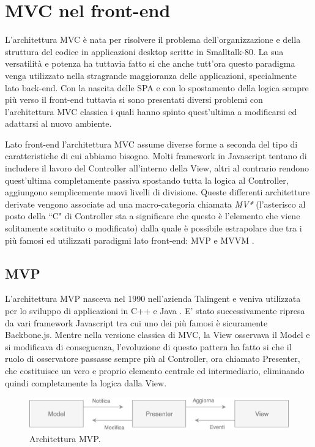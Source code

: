 \section{MVC nel front-end}
L'architettura MVC è nata per risolvere il problema dell'organizzazione e della struttura del codice in applicazioni desktop scritte in Smalltalk-80. La sua versatilità e potenza ha tuttavia fatto si che anche tutt'ora questo paradigma venga utilizzato nella stragrande maggioranza delle applicazioni, specialmente lato back-end.
Con la nascita delle SPA e con lo spostamento della logica sempre più verso il front-end tuttavia si sono presentati diversi problemi con l'architettura MVC classica i quali hanno spinto quest'ultima a modificarsi ed adattarsi al nuovo ambiente.

Lato front-end l'architettura MVC assume diverse forme a seconda del tipo di caratteristiche di cui abbiamo bisogno. Molti framework in Javascript tentano di includere il lavoro del Controller all'interno della View, altri al contrario rendono quest'ultima completamente passiva spostando tutta la logica al Controller,  aggiungono semplicemente nuovi livelli di divisione. Queste differenti architetture derivate vengono associate ad una macro-categoria chiamata \textit{MV*} (l'asterisco al posto della “C" di Controller sta a significare che questo è l'elemento che viene solitamente sostituito o modificato) dalla quale è possibile estrapolare due tra i più famosi ed utilizzati paradigmi lato front-end: MVP e MVVM \cite{OsmaniOnJSFrameworks}.

\subsection{MVP}
L'architettura MVP nasceva nel 1990 nell'azienda Talingent e veniva utilizzata per lo sviluppo di applicazioni in C++ e Java \cite{Potel1996mvp}. E' stato successivamente ripresa da vari framework Javascript tra cui uno dei più famosi è sicuramente Backbone.js.
Mentre nella versione classica di MVC, la View osservava il Model e si modificava di conseguenza, l'evoluzione di questo pattern ha fatto si che il ruolo di osservatore passasse sempre più al Controller, ora chiamato Presenter, che costituisce un vero e proprio elemento centrale ed intermediario, eliminando quindi completamente la logica dalla View.

\begin{figure}[h]
\centering 
\vspace*{0.5cm}
\includegraphics[width=13cm]{./images/MVPworkflow}
\caption{Architettura MVP.}
\vspace*{0.5cm} 
\end{figure}

